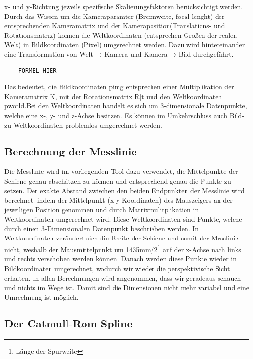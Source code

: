 \documentclass[11pt]{scrartcl}
\begin{document}
x- und y-Richtung jeweils spezifische Skalierungsfaktoren berücksichtigt werden.
Durch das Wissen um die Kameraparamter (Brennweite, focal lenght) der
entsprechenden Kameramatrix und der Kameraposition(Translations- und
Rotationsmatrix) können die Weltkoordinaten (entsprechen Größen der realen Welt)
in Bildkoordinaten (Pixel) umgerechnet werden. Dazu wird hintereinander eine
Transformation von Welt → Kamera und Kamera → Bild durchgeführt.
\begin{lstlisting}
	FORMEL HIER
\end{lstlisting}
Das bedeutet, die Bildkoordinaten pimg entsprechen einer Multiplikation der
Kameramatrix K, mit der Rotationsmatrix R|t und den Weltkoordinaten pworld.Bei den Weltkoordinaten handelt es sich um 3-dimensionale Datenpunkte, welche eine x-, y- und z-Achse besitzen. Es können im Umkehrschluss auch
Bild- zu Weltkoordinaten problemlos umgerechnet werden.

\subsection{Berechnung der Messlinie}
\label{sec:Berechnung der Messlinie}

\noindent
Die Messlinie wird im vorliegenden Tool dazu verwendet, die Mittelpunkte der Schiene genau abschätzen zu können und entsprechend genau die Punkte zu setzen. Der exakte Abstand zwischen den beiden Endpunkten der Messlinie wird berechnet,
indem der Mittelpunkt (x-y-Koordinaten) des Mauszeigers an der jeweiligen Position
genommen und durch Matrixmulitplikation in Weltkoordinaten umgerechnet wird. Diese Weltkoordinaten sind Punkte, welche durch einen 3-Dimensionalen Datenpunkt beschrieben werden. In Weltkoordinaten verändert sich die Breite der Schiene und somit der Messlinie nicht, weshalb der Mausmittelpunkt um 1435mm/2\footnote{Länge der Spurweite} auf der x-Achse nach links und rechts verschoben werden können. Danach werden diese Punkte wieder in
Bildkoordinaten umgerechnet, wodurch wir wieder die perspektivische Sicht erhalten.
In allen Berechnungen wird angenommen, dass wir geradeaus schauen und nichts
im Wege ist. Damit sind die Dimensionen nicht mehr variabel und eine Umrechnung
ist möglich.



\subsection{Der Catmull-Rom Spline}
\end{document}
